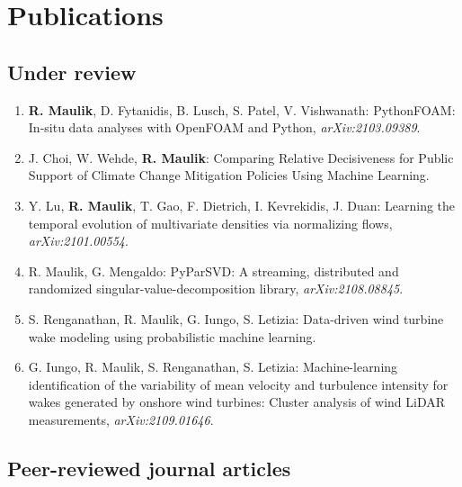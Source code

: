 \documentclass[letterpaper]{article}
\begin{document}
\section*{Publications}

\subsection*{Under review}

\begin{enumerate}

\item \textbf{R. Maulik}, D. Fytanidis, B. Lusch, S. Patel, V. Vishwanath: PythonFOAM: In-situ data analyses with OpenFOAM and Python, {\it arXiv:2103.09389}.

\item J. Choi, W. Wehde, \textbf{R. Maulik}: Comparing Relative Decisiveness for Public Support of Climate Change Mitigation Policies Using Machine Learning.

\item Y. Lu, \textbf{R. Maulik}, T. Gao, F. Dietrich, I. Kevrekidis, J. Duan: Learning the temporal evolution of multivariate densities via normalizing flows, {\it arXiv:2101.00554}.

\item R. Maulik, G. Mengaldo: PyParSVD: A streaming, distributed and randomized singular-value-decomposition library, {\it arXiv:2108.08845}.

\item S. Renganathan, R. Maulik, G. Iungo, S. Letizia: Data-driven wind turbine wake modeling using probabilistic machine learning.

\item G. Iungo, R. Maulik, S. Renganathan, S. Letizia: Machine-learning identification of the variability of mean velocity and turbulence intensity for wakes generated by onshore wind turbines: Cluster analysis of wind LiDAR measurements, {\it arXiv:2109.01646}.

\end{enumerate}


\subsection*{Peer-reviewed journal articles}
\end{document}
